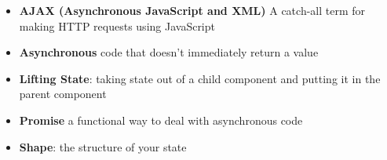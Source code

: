 \begin{itemize}[leftmargin=*]
    \item
        \textbf{AJAX (Asynchronous JavaScript and XML)}
        A catch-all term for making HTTP requests using JavaScript
    \item
        \textbf{Asynchronous}
        code that doesn't immediately return a value
    \item
        \textbf{Lifting State}:
        taking state out of a child component and putting it in the parent component
    \item
        \textbf{Promise}
        a functional way to deal with asynchronous code
    \item
        \textbf{Shape}:
        the structure of your state
\end{itemize}
